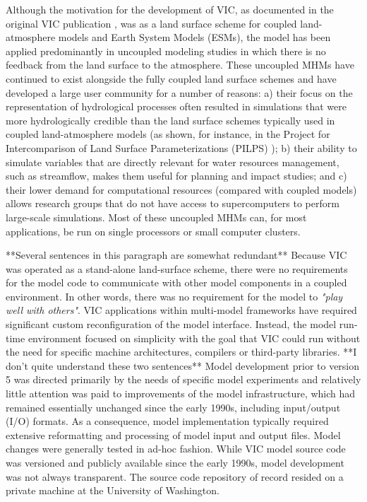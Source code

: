\documentclass[gmd, manuscript]{copernicus}
\begin{document}
  Although the motivation for the development of VIC, as documented in the original VIC publication \citep{Liang_1994}, was as a land surface scheme for coupled land-atmosphere models and Earth System Models (ESMs), the model has been applied predominantly in uncoupled modeling studies in which there is no feedback from the land surface to the atmosphere. These uncoupled MHMs have continued to exist alongside the fully coupled land surface schemes and have developed a large user community for a number of reasons: a) their focus on the representation of hydrological processes often resulted in simulations that were more hydrologically credible than the land surface schemes typically used in coupled land-atmosphere models (as shown, for instance, in the Project for Intercomparison of Land Surface Parameterizations (PILPS) \citep{Bowling_2003,wood_1998}); b) their ability to simulate variables that are directly relevant for water resources management, such as streamflow, makes them useful for planning and impact studies; and c) their lower demand for computational resources (compared with coupled models) allows research groups that do not have access to supercomputers to perform large-scale simulations. Most of these uncoupled MHMs can, for most applications, be run on single processors or small computer clusters.

  **Several sentences in this paragraph are somewhat redundant** Because VIC was operated as a stand-alone land-surface scheme, there were no requirements for the model code to communicate with other model components in a coupled environment. In other words, there was no requirement for the model to \textit{"play well with others"}. {VIC applications within multi-model frameworks \citep[e.g. NASA LIS, ][]{Kumar_2006} have  required significant custom reconfiguration of the model interface. Instead, the model run-time environment focused on simplicity with the goal that VIC could run without the need for specific machine architectures, compilers or third-party libraries.} **I don't quite understand these two sentences** Model development prior to version 5 was directed primarily by the needs of specific model experiments and relatively little attention was paid to improvements of the model infrastructure, which had remained essentially unchanged since the early 1990s, including input/output (I/O) formats. As a consequence, model implementation typically required extensive reformatting and processing of model input and output files. Model changes were generally tested in ad-hoc fashion. While VIC model source code was versioned and publicly available since the early 1990s, model development was not always transparent. The source code repository of record resided on a private machine at the University of Washington.
\end{document}
